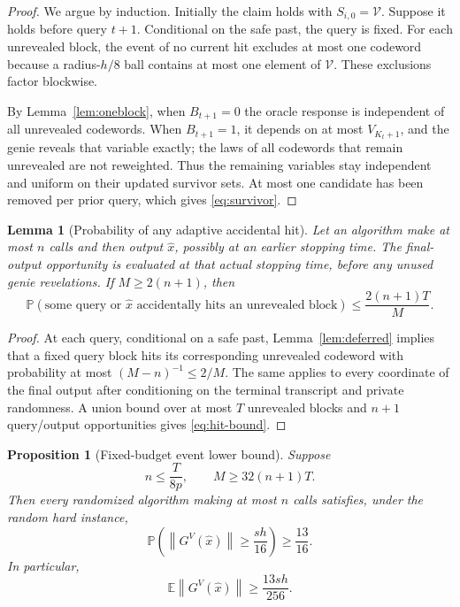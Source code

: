 \documentclass[11pt,a4paper]{article}
\newcommand{\E}{\mathbb E}
\newcommand{\Pp}{\mathbb P}
\newcommand{\norm}[1]{\left\lVert #1\right\rVert}
\newcommand{\cV}{\mathcal V}
\newtheorem{lemma}[theorem]{Lemma}
\newtheorem{proposition}[theorem]{Proposition}
\theoremstyle{definition}
\theoremstyle{remark}
\begin{document}
\begin{proof}
We argue by induction.  Initially the claim holds with $S_{i,0}=\cV$.  Suppose it holds before query $t+1$.  Conditional on the safe past, the query is fixed.  For each unrevealed block, the event of no current hit excludes at most one codeword because a radius-$h/8$ ball contains at most one element of $\cV$.  These exclusions factor blockwise.

By Lemma~\ref{lem:oneblock}, when $B_{t+1}=0$ the oracle response is independent of all unrevealed codewords.  When $B_{t+1}=1$, it depends on at most $V_{K_t+1}$, and the genie reveals that variable exactly; the laws of all codewords that remain unrevealed are not reweighted.  Thus the remaining variables stay independent and uniform on their updated survivor sets.  At most one candidate has been removed per prior query, which gives \eqref{eq:survivor}.
\end{proof}

\begin{lemma}[Probability of any adaptive accidental hit]\label{lem:hit-bound}
Let an algorithm make at most $n$ calls and then output $\widehat x$, possibly at an earlier stopping time. The final-output opportunity is evaluated at that actual stopping time, before any unused genie revelations. If $M\ge2(n+1)$, then
\begin{equation}
 \Pp(\text{some query or }\widehat x\text{ accidentally hits an unrevealed block})
 \le \frac{2(n+1)T}{M}.
 \label{eq:hit-bound}
\end{equation}
\end{lemma}

\begin{proof}
At each query, conditional on a safe past, Lemma~\ref{lem:deferred} implies that a fixed query block hits its corresponding unrevealed codeword with probability at most $(M-n)^{-1}\le2/M$.  The same applies to every coordinate of the final output after conditioning on the terminal transcript and private randomness.  A union bound over at most $T$ unrevealed blocks and $n+1$ query/output opportunities gives \eqref{eq:hit-bound}.
\end{proof}

\begin{proposition}[Fixed-budget event lower bound]\label{prop:fixed}
Suppose
\begin{equation}
 n\le\frac{T}{8p},
 \qquad
 M\ge32(n+1)T.
 \label{eq:fixed-conditions}
\end{equation}
Then every randomized algorithm making at most $n$ calls satisfies, under the random hard instance,
\begin{equation}
 \Pp\left(\norm{G^V(\widehat x)}\ge\frac{sh}{16}\right)
 \ge\frac{13}{16}.
 \label{eq:event-lb}
\end{equation}
In particular,
\begin{equation}
 \E\norm{G^V(\widehat x)}\ge\frac{13sh}{256}.
 \label{eq:expected-fixed}
\end{equation}
\end{proposition}
\end{document}
